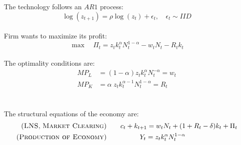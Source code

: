 \documentclass[12pt]{extarticle}
\begin{document}
The technology follows an $AR1$ process:
    \begin{equation}
    \log(z_{t+1}) = \rho \log(z_t) + \epsilon_t, \quad \epsilon_t \sim IID
   \end{equation} \\
Firm wants to maximize its profit:
\begin{equation}
    \max\quad \Pi_t = z_t k_t^{\alpha} N_t^{1-\alpha} - w_t N_t - R_t k_t 
   \end{equation}\\
The optimality conditions are:
   \begin{align}
        MP_L &= (1-\alpha) z_t k_t^{\alpha} N_t^{-\alpha} = w_t\\
        MP_K &= \alpha\; z_t k_t^{\alpha-1} N_t^{1-\alpha} = R_t
    \end{align}\\\\
The structural equations of the economy are:
\begin{align}
    \textsc{(LNS,\;Market Clearing)}&\qquad c_t + k_{t+1} = w_t N_t + (1 + R_t - \delta) k_t + \Pi_t\\
    \textsc{(Production of Economy)}&\qquad \qquad \;\;\;Y_t = z_t k_t^{\alpha} N_t^{1-\alpha}
\end{align}
    
\end{document}
